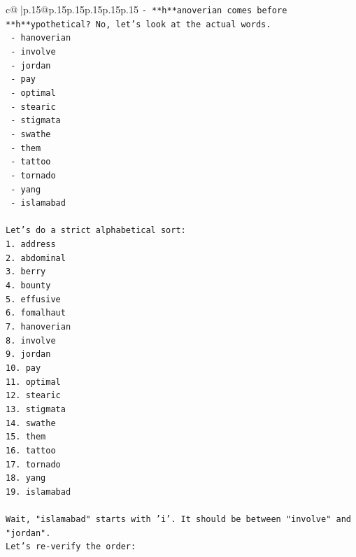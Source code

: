 \documentclass{article}
\begin{document}
{\begin{supertabular}{c@{$\;$}|p{.15\linewidth}@{}p{.15\linewidth}p{.15\linewidth}p{.15\linewidth}p{.15\linewidth}p{.15\linewidth}}
{{{\texttt{{-}   **h**anoverian comes before **h**ypothetical? No, let's look at the actual words.} \\
\texttt{    {-}   hanoverian} \\
\texttt{    {-}   involve} \\
\texttt{    {-}   jordan} \\
\texttt{    {-}   pay} \\
\texttt{    {-}   optimal} \\
\texttt{    {-}   stearic} \\
\texttt{    {-}   stigmata} \\
\texttt{    {-}   swathe} \\
\texttt{    {-}   them} \\
\texttt{    {-}   tattoo} \\
\texttt{    {-}   tornado} \\
\texttt{    {-}   yang} \\
\texttt{    {-}   islamabad} \\
\\ 
\texttt{Let's do a strict alphabetical sort:} \\
\texttt{1.  address} \\
\texttt{2.  abdominal} \\
\texttt{3.  berry} \\
\texttt{4.  bounty} \\
\texttt{5.  effusive} \\
\texttt{6.  fomalhaut} \\
\texttt{7.  hanoverian} \\
\texttt{8.  involve} \\
\texttt{9.  jordan} \\
\texttt{10. pay} \\
\texttt{11. optimal} \\
\texttt{12. stearic} \\
\texttt{13. stigmata} \\
\texttt{14. swathe} \\
\texttt{15. them} \\
\texttt{16. tattoo} \\
\texttt{17. tornado} \\
\texttt{18. yang} \\
\texttt{19. islamabad} \\
\\ 
\texttt{Wait, "islamabad" starts with 'i'. It should be between "involve" and "jordan".} \\
\texttt{Let's re{-}verify the order:} \\
}}}
\end{supertabular}}
\end{document}
